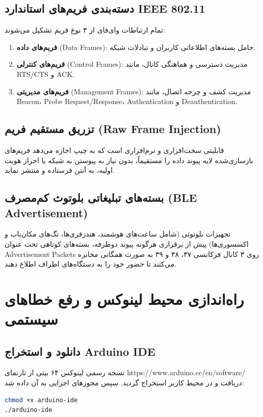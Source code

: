 \documentclass[11pt,a4paper]{article}
\newcommand{\lr}[1]{\foreignlanguage{english}{#1}}
\newenvironment{latin}{\par\beginL\selectlanguage{english}}{\endL\par}
\newcommand{\en}[1]{\lr{#1}}
\begin{document}
\subsection{دسته‌بندی فریم‌های استاندارد \en{IEEE 802.11}}
تمام ارتباطات وای‌فای از ۳ نوع فریم تشکیل می‌شوند:
\begin{enumerate}
    \item \textbf{فریم‌های داده} \en{(Data Frames)}: حامل بسته‌های اطلاعاتی کاربران و تبادلات شبکه.
    \item \textbf{فریم‌های کنترلی} \en{(Control Frames)}: مدیریت دسترسی و هماهنگی کانال، مانند \en{RTS/CTS} و \en{ACK}.
    \item \textbf{فریم‌های مدیریتی} \en{(Management Frames)}: مدیریت کشف و چرخه اتصال، مانند \en{Beacon}، \en{Probe Request/Response}، \en{Authentication} و \en{Deauthentication}.
\end{enumerate}

\subsection{تزریق مستقیم فریم \en{(Raw Frame Injection)}}
قابلیتی سخت‌افزاری و نرم‌افزاری است که به چیپ اجازه می‌دهد فریم‌های بازسازی‌شده لایه پیوند داده را مستقیماً، بدون نیاز به پیوستن به شبکه یا احراز هویت اولیه، به آنتن فرستاده و منتشر نماید.

\subsection{بسته‌های تبلیغاتی بلوتوث کم‌مصرف \en{(BLE Advertisement)}}
تجهیزات بلوتوثی (شامل ساعت‌های هوشمند، هندزفری‌ها، تگ‌های مکان‌یاب و اکسسوری‌ها) پیش از برقراری هرگونه پیوند دوطرفه، بسته‌های کوتاهی تحت عنوان \lr{Advertisement Packets} روی ۳ کانال فرکانسی ۳۷، ۳۸ و ۳۹ به صورت همگانی مخابره می‌کنند تا حضور خود را به دستگاه‌های اطراف اطلاع دهند.

\newpage
\section{راه‌اندازی محیط لینوکس و رفع خطاهای سیستمی}

\subsection{دانلود و استخراج Arduino IDE}
نسخه رسمی لینوکس ۶۴ بیتی از تارنمای \lr{https://www.arduino.cc/en/software/} دریافت و در محیط کاربر استخراج گردید. سپس مجوزهای اجرایی به آن داده شد:
\begin{latin}
\begin{lstlisting}[language=bash]
chmod +x arduino-ide
./arduino-ide
\end{lstlisting}
\end{latin}
\end{document}
